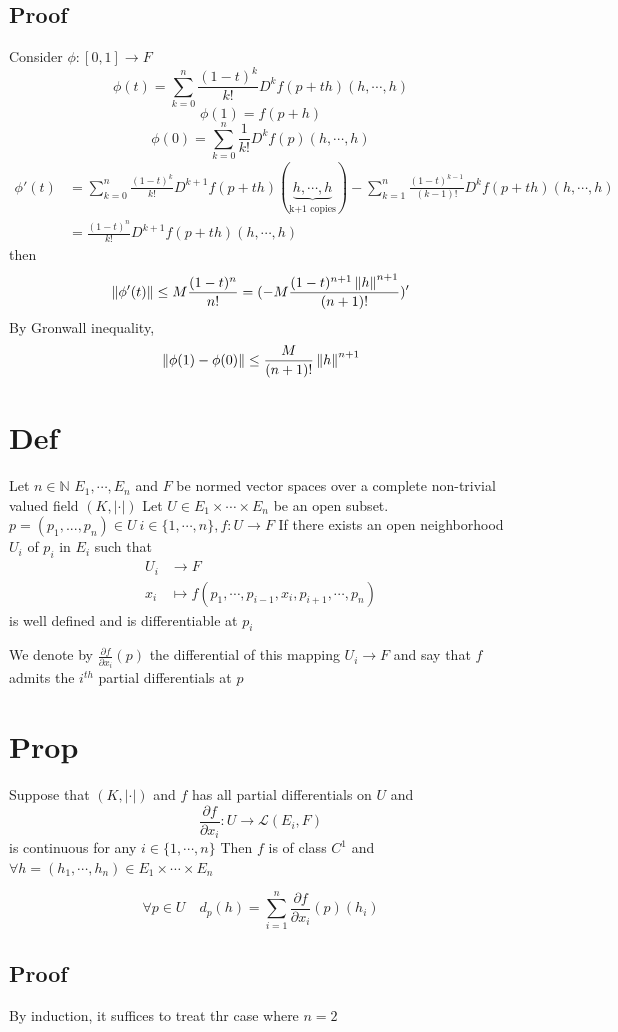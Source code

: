 \documentclass{book}
\newcommand{\abs}[1]{\left\lvert #1 \right\rvert}
\begin{document}
\subsection*{Proof}
Consider $\phi:[0,1]\rightarrow F$
$$\phi(t)=\sum\limits_{k=0}^n\frac{(1-t)^k}{k!}D^kf(p+th)(h,\cdots,h)$$
$$\phi(1)=f(p+h)$$
$$\phi(0)=\sum\limits_{k=0}^n\frac{1}{k!}D^kf(p)(h,\cdots,h)$$
$$
\begin{aligned}
    \phi'(t) &= \sum\limits_{k=0}^{n}\frac{(1-t)^k}{k!}D^{k+1}f(p+th)(\underbrace{h,\cdots,h}\limits_{\text{k+1 copies}})-\sum\limits_{k=1}^n\frac{(1-t)^{k-1}}{(k-1)!}D^kf(p+th)(h,\cdots,h)\\
    &= \frac{(1-t)^n}{k!}D^{k+1}f(p+th)(h,\cdots,h)
\end{aligned}
$$
then $$\left\lVert \phi'(t) \right\rVert\leq M\frac{(1-t)^n}{n!}=(-M\frac{(1-t)^{n+1}\left\lVert h \right\rVert^{n+1}}{(n+1)!})'$$
By Gronwall inequality,
$$\left\lVert \phi(1)-\phi(0) \right\rVert\leq\frac{M}{(n+1)!}\left\lVert h \right\rVert^{n+1}$$
\section{Def}
Let $n\in\mathbb{N}$ $E_1,\cdots,E_n$ and $F$ be normed vector spaces over a complete non-trivial valued field $(K,\abs\cdot)$ Let $U\in E_1\times\cdots\times E_n$ be an open subset. $p=(p_1,...,p_n)\in U\ i\in \{1,\cdots,n\},f:U\rightarrow F$
If there exists an open neighborhood $U_i$ of $p_i$ in $E_i$ such that $$\begin{aligned}
    U_i &\rightarrow F\\
    x_i &\mapsto f(p_1,\cdots,p_{i-1},x_i,p_{i+1},\cdots,p_n)
\end{aligned}$$
is well defined and is differentiable at $p_i$

We denote by $\frac{\partial f}{\partial x_i}(p)$ the differential of this mapping $U_i\rightarrow F$ and say that $f$ admits the $i^{th}$ partial differentials at $p$
\section{Prop}
Suppose that $(K,\abs\cdot)$ and $f$ has all partial differentials on $U$ and $$\frac{\partial f}{\partial x_i}:U\rightarrow \mathscr{L}(E_i,F)$$ is continuous for any $i\in \{1,\cdots,n\}$ Then $f$ is of class $C^1$ and $\forall h=(h_1,\cdots,h_n)\in E_1\times\cdots\times E_n$

$$\forall p\in U\quad d_p(h)=\sum\limits_{i=1}^n\frac{\partial f}{\partial x_i}(p)(h_i)$$
\subsection*{Proof}
By induction, it suffices to treat thr case where $n=2$
\end{document}

